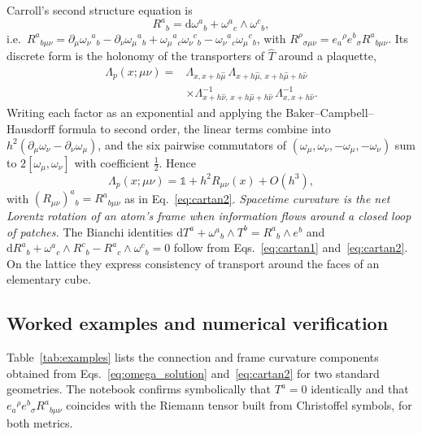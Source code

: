 \documentclass[reprint,aps,prd,amsmath,amssymb,superscriptaddress,nofootinbib,floatfix]{revtex4-2}
\theoremstyle{plain}
\theoremstyle{definition}
\theoremstyle{remark}
\newcommand{\dd}{\mathrm{d}}
\newcommand{\Tc}{\hat{T}}
\newcommand{\one}{\mathbb{1}}
\begin{document}
Carroll's second structure equation is
\begin{equation}
R^a{}_b=\dd\omega^a{}_b+\omega^a{}_c\wedge\omega^c{}_b ,
\label{eq:cartan2}
\end{equation}
i.e.\ $R^a{}_{b\mu\nu}=\partial_\mu\omega_\nu{}^a{}_b-\partial_\nu\omega_\mu{}^a{}_b
+\omega_\mu{}^a{}_c\omega_\nu{}^c{}_b-\omega_\nu{}^a{}_c\omega_\mu{}^c{}_b$, with
$R^\rho{}_{\sigma\mu\nu}=e_a{}^\rho e^b{}_\sigma R^a{}_{b\mu\nu}$. Its discrete form is the holonomy of the
transporters of $\Tc$ around a plaquette,
\begin{equation}
\begin{aligned}
\Lambda_p(x;\mu\nu)={}&\Lambda_{x,x+h\hat\mu}\,\Lambda_{x+h\hat\mu,\,x+h\hat\mu+h\hat\nu}\\
&\times\Lambda_{x+h\hat\nu,\,x+h\hat\mu+h\hat\nu}^{-1}\,\Lambda_{x,x+h\hat\nu}^{-1}.
\end{aligned}
\label{eq:plaquette}
\end{equation}
Writing each factor as an exponential and applying the Baker--Campbell--Hausdorff formula to second
order, the linear terms combine into $h^2(\partial_\mu\omega_\nu-\partial_\nu\omega_\mu)$, and the six pairwise
commutators of $(\omega_\mu,\omega_\nu,-\omega_\mu,-\omega_\nu)$ sum to $2[\omega_\mu,\omega_\nu]$ with coefficient
$\tfrac12$. Hence
\begin{equation}
\Lambda_p(x;\mu\nu)=\one+h^2R_{\mu\nu}(x)+O(h^3),
\label{eq:holonomy_curvature}
\end{equation}
with $(R_{\mu\nu})^a{}_b=R^a{}_{b\mu\nu}$ as in Eq.~\eqref{eq:cartan2}. \emph{Spacetime curvature is the net Lorentz
rotation of an atom's frame when information flows around a closed loop of patches.} The Bianchi
identities $\dd T^a+\omega^a{}_b\wedge T^b=R^a{}_b\wedge e^b$ and $\dd R^a{}_b+\omega^a{}_c\wedge R^c{}_b
-R^a{}_c\wedge\omega^c{}_b=0$ follow from Eqs.~\eqref{eq:cartan1} and~\eqref{eq:cartan2}. On the lattice they
express consistency of transport around the faces of an elementary cube.

\subsection{Worked examples and numerical verification}

Table~\ref{tab:examples} lists the connection and frame curvature components obtained from
Eqs.~\eqref{eq:omega_solution} and~\eqref{eq:cartan2} for two standard geometries. The notebook confirms
symbolically that $T^a=0$ identically and that $e_a{}^\rho e^b{}_\sigma R^a{}_{b\mu\nu}$ coincides with the
Riemann tensor built from Christoffel symbols, for both metrics.
\end{document}
